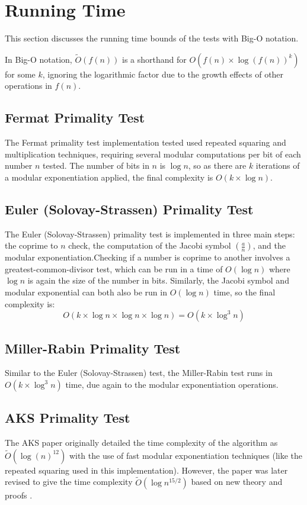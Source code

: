 \documentclass{article}
\begin{document}
\section{Running Time}
This section discusses the running time bounds of the tests with Big-O notation.

In Big-O notation, $\widetilde{O}(f(n))$ is a shorthand for $O(f(n) \times \log{(f(n))}^k)$ for some $k$, ignoring the logarithmic factor due to the growth effects of other operations in $f(n)$.

\subsection{Fermat Primality Test}
The Fermat primality test implementation tested used repeated squaring and multiplication techniques, requiring several modular computations per bit of each number $n$ tested. The number of bits in $n$ is $\log{n}$, so as there are $k$ iterations of a modular exponentiation applied, the final complexity is $O(k \times \log{n})$.

\subsection{Euler (Solovay-Strassen) Primality Test}
The Euler (Solovay-Strassen) primality test is implemented in three main steps: the coprime to $n$ check, the computation of the Jacobi symbol $(\frac{a}{n})$, and the modular exponentiation.Checking if a number is coprime to another involves a greatest-common-divisor test, which can be run in a time of $O(\log{n})$ where $\log{n}$ is again the size of the number in bits. Similarly, the Jacobi symbol and modular exponential can both also be run in $O(\log{n})$ time, so the final complexity is:
\[
    O(k \times \log{n} \times \log{n} \times \log{n}) = O(k \times \log^3{n})
\]

\subsection{Miller-Rabin Primality Test}
Similar to the Euler (Solovay-Strassen) test, the Miller-Rabin test runs in $O(k \times \log^3{n})$ time, due again to the modular exponentiation operations.

\subsection{AKS Primality Test}
The AKS paper originally detailed the time complexity of the algorithm as $\widetilde{O}(\log(n)^{12})$ with the use of fast modular exponentiation techniques (like the repeated squaring used in this implementation). However, the paper was later revised to give the time complexity $\widetilde{O}(\log{n}^{15/2})$ based on new theory and proofs \cite{agrawal_primes_2004}.
\end{document}
